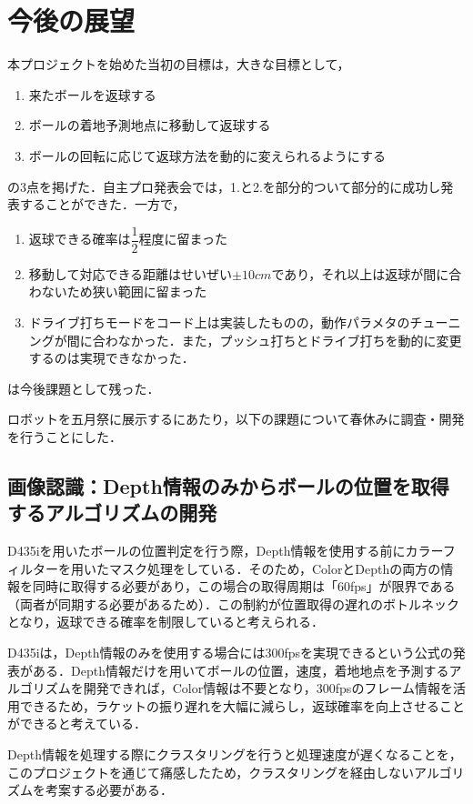 \documentclass[10pt, oneside, titlepage]{ltjarticle}  %
\begin{document}
\section{今後の展望}
  本プロジェクトを始めた当初の目標は，大きな目標として，
  \begin{enumerate}
    \item 来たボールを返球する
    \item ボールの着地予測地点に移動して返球する
    \item ボールの回転に応じて返球方法を動的に変えられるようにする
  \end{enumerate}
  の3点を掲げた．自主プロ発表会では，1.と2.を部分的ついて部分的に成功し発表することができた．一方で，
  \begin{enumerate}
    \item 返球できる確率は$\dfrac{1}{2}$程度に留まった
    \item 移動して対応できる距離はせいぜい$\pm 10 cm$であり，それ以上は返球が間に合わないため狭い範囲に留まった
    \item ドライブ打ちモードをコード上は実装したものの，動作パラメタのチューニングが間に合わなかった．また，プッシュ打ちとドライブ打ちを動的に変更するのは実現できなかった．
  \end{enumerate}
  は今後課題として残った．

  ロボットを五月祭に展示するにあたり，以下の課題について春休みに調査・開発を行うことにした．

  \subsection{画像認識：Depth情報のみからボールの位置を取得するアルゴリズムの開発}
  D435iを用いたボールの位置判定を行う際，Depth情報を使用する前にカラーフィルターを用いたマスク処理をしている．そのため，ColorとDepthの両方の情報を同時に取得する必要があり，この場合の取得周期は「60fps」が限界である（両者が同期する必要があるため）．この制約が位置取得の遅れのボトルネックとなり，返球できる確率を制限していると考えられる．

  D435iは，Depth情報のみを使用する場合には300fpsを実現できるという公式の発表がある\cite{intel}．Depth情報だけを用いてボールの位置，速度，着地地点を予測するアルゴリズムを開発できれば，Color情報は不要となり，300fpsのフレーム情報を活用できるため，ラケットの振り遅れを大幅に減らし，返球確率を向上させることができると考えている．

  Depth情報を処理する際にクラスタリングを行うと処理速度が遅くなることを，このプロジェクトを通じて痛感したため，クラスタリングを経由しないアルゴリズムを考案する必要がある．
\end{document}
